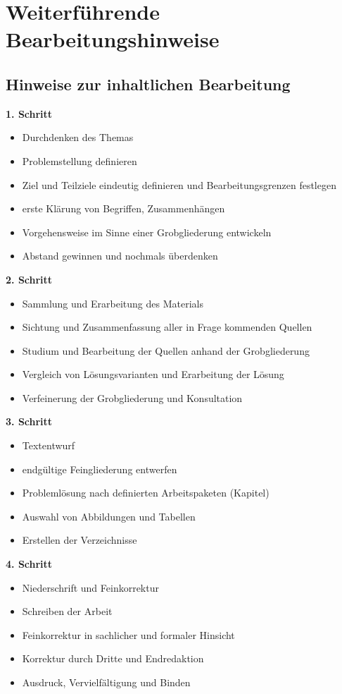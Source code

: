 \chapter{Weiterführende Bearbeitungshinweise}
\label{weitere-hinweise}
\section{Hinweise zur inhaltlichen Bearbeitung}
\label{weitere-hinweise-inhaltliche-bearbeitung}
\textbf{1. Schritt}
\begin{itemize}
    \item Durchdenken des Themas
    \item Problemstellung definieren
    \item Ziel und Teilziele eindeutig definieren und Bearbeitungsgrenzen festlegen
    \item erste Klärung von Begriffen, Zusammenhängen
    \item Vorgehensweise im Sinne einer Grobgliederung entwickeln
    \item Abstand gewinnen und nochmals überdenken
\end{itemize}
\textbf{2. Schritt}
\begin{itemize}
    \item Sammlung und Erarbeitung des Materials
    \item Sichtung und Zusammenfassung aller in Frage kommenden Quellen
    \item Studium und Bearbeitung der Quellen anhand der Grobgliederung
    \item Vergleich von Lösungsvarianten und Erarbeitung der Lösung
    \item Verfeinerung der Grobgliederung und Konsultation
\end{itemize}
\textbf{3. Schritt}
\begin{itemize}
    \item Textentwurf
    \item endgültige Feingliederung entwerfen
    \item Problemlösung nach definierten Arbeitspaketen (Kapitel)
    \item Auswahl von Abbildungen und Tabellen
    \item Erstellen der Verzeichnisse
\end{itemize}
\textbf{4. Schritt}
\begin{itemize}
    \item Niederschrift und Feinkorrektur
    \item Schreiben der Arbeit 
    \item Feinkorrektur in sachlicher und formaler Hinsicht
    \item Korrektur durch Dritte und Endredaktion
    \item Ausdruck, Vervielfältigung und Binden
\end{itemize}
